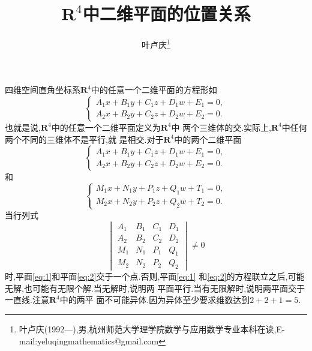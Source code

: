 \documentclass[a4paper]{article}
\begin{document}
\title{\huge{\bf{$\mathbf{R}^4$中二维平面的位置关系}}} \author{\small{叶卢庆\footnote{叶卢庆(1992---),男,杭州师范大学理学院数学与应用数学专业本科在读,E-mail:yeluqingmathematics@gmail.com}}}
\maketitle
四维空间直角坐标系$\mathbf{R}^4$中的任意一个二维平面的方程形如
$$
\begin{cases}
  A_1x+B_1y+C_1z+D_1w+E_1=0,\\
  A_2x+B_2y+C_2z+D_2w+E_2=0.
\end{cases}
$$
也就是说,$\mathbf{R}^{4}$中的任意一个二维平面定义为$\mathbf{R}^{4}$中
两个三维体的交.实际上,$\mathbf{R}^4$中任何两个不同的三维体不是平行,就
是相交.对于$\mathbf{R}^4$中的两个二维平面
\begin{equation}\label{eq:1}
\begin{cases}
  A_1x+B_1y+C_1z+D_1w+E_1=0,\\
  A_2x+B_2y+C_2z+D_2w+E_2=0.
\end{cases}
\end{equation}
和
\begin{equation}
  \label{eq:2}
\begin{cases}
  M_1x+N_1y+P_1z+Q_1w+T_1=0,\\
M_2x+N_2y+P_2z+Q_2w+T_2=0.
\end{cases}
\end{equation}
当行列式
$$
\begin{vmatrix}
  A_1&B_1&C_1&D_1\\
A_2&B_2&C_2&D_2\\
M_1&N_1&P_1&Q_1\\
M_2&N_2&P_2&Q_2
\end{vmatrix}\neq 0
$$
时,平面\eqref{eq:1}和平面\eqref{eq:2}交于一个点.否则,平面\eqref{eq:1}
和\eqref{eq:2}的方程联立之后,可能无解,也可能有无限个解.当无解时,说明两
平面平行.当有无限解时,说明两平面交于一直线.注意$\mathbf{R}^4$中的两平
面不可能异体.因为异体至少要求维数达到$2+2+1=5$.
\end{document}

